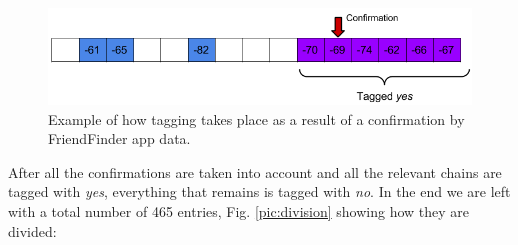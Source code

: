 \begin{figure}[h]
	\begin{center}
		\includegraphics[scale=0.6]{figures/taggedyes.png}
	\end{center}
	
	\caption{Example of how tagging takes place as a result of a confirmation by FriendFinder app data.}
	\label{pic:tag_yes}

\end{figure}

After all the confirmations are taken into account and all the relevant chains are tagged with \textit{yes}, everything that remains is tagged with \textit{no}.  In the end we are left with a total number of 465 entries, Fig. \ref{pic:division} showing how they are divided:
